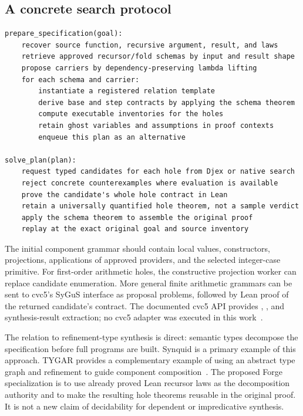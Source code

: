 \subsection{A concrete search protocol}
\begin{lstlisting}
prepare_specification(goal):
    recover source function, recursive argument, result, and laws
    retrieve approved recursor/fold schemas by input and result shape
    propose carriers by dependency-preserving lambda lifting
    for each schema and carrier:
        instantiate a registered relation template
        derive base and step contracts by applying the schema theorem
        compute executable inventories for the holes
        retain ghost variables and assumptions in proof contexts
        enqueue this plan as an alternative

solve_plan(plan):
    request typed candidates for each hole from Djex or native search
    reject concrete counterexamples where evaluation is available
    prove the candidate's whole hole contract in Lean
    retain a universally quantified hole theorem, not a sample verdict
    apply the schema theorem to assemble the original proof
    replay at the exact original goal and source inventory
\end{lstlisting}

The initial component grammar should contain local values, constructors,
projections, applications of approved providers, and the selected integer-case
primitive. For first-order arithmetic holes, the constructive projection worker
can replace candidate enumeration. More general finite arithmetic grammars can
be sent to cvc5's SyGuS interface as proposal problems, followed by Lean proof
of the returned candidate's contract. The documented cvc5 API provides
, , and synthesis-result extraction;
no cvc5 adapter was executed in this work~\cite{cvc5}.

The relation to refinement-type synthesis is direct: semantic types decompose
the specification before full programs are built. Synquid is a primary example
of this approach. TYGAR provides a complementary example of using an abstract
type graph and refinement to guide component composition~\cite{synquid,tygar}.
The proposed Forge specialization is to use already proved Lean recursor laws
as the decomposition authority and to make the resulting hole theorems reusable
in the original proof. It is not a new claim of decidability for dependent or
impredicative synthesis.

